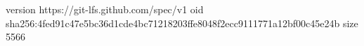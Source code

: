 version https://git-lfs.github.com/spec/v1
oid sha256:4fed91c47e5bc36d1cde4bc71218203ffe8048f2ecc9111771a12bf00c45e24b
size 5566
